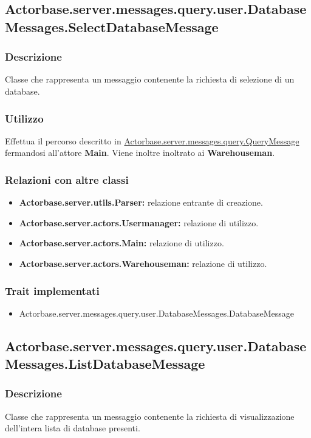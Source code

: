 \documentclass[a4paper]{article}
\begin{document}
		\subsection{Actorbase.server.messages.query.user.DatabaseMessages.SelectDatabaseMessage}
			\subsubsection{Descrizione}
				Classe che rappresenta un messaggio contenente la richiesta di selezione di un database.
				
			\subsubsection{Utilizzo}
				Effettua il percorso descritto in \hyperref[QueryMessage]{Actorbase.server.messages.query.QueryMessage} fermandosi all'attore \textbf{Main}.
				Viene inoltre inoltrato ai \textbf{Warehouseman}.
				
			\subsubsection{Relazioni con altre classi}
				\begin{itemize}
					\item \textbf{Actorbase.server.utils.Parser:} relazione entrante di creazione.
					\item \textbf{Actorbase.server.actors.Usermanager:} relazione di utilizzo.
					\item \textbf{Actorbase.server.actors.Main:} relazione di utilizzo.
					\item \textbf{Actorbase.server.actors.Warehouseman:} relazione di utilizzo.
				\end{itemize}
			\subsubsection{Trait implementati}
				\begin{itemize}
					\item Actorbase.server.messages.query.user.DatabaseMessages.DatabaseMessage
				\end{itemize}
				
		\subsection{Actorbase.server.messages.query.user.DatabaseMessages.ListDatabaseMessage}
			\subsubsection{Descrizione}
				Classe che rappresenta un messaggio contenente la richiesta di visualizzazione dell'intera lista di database presenti.
				
\end{document}
